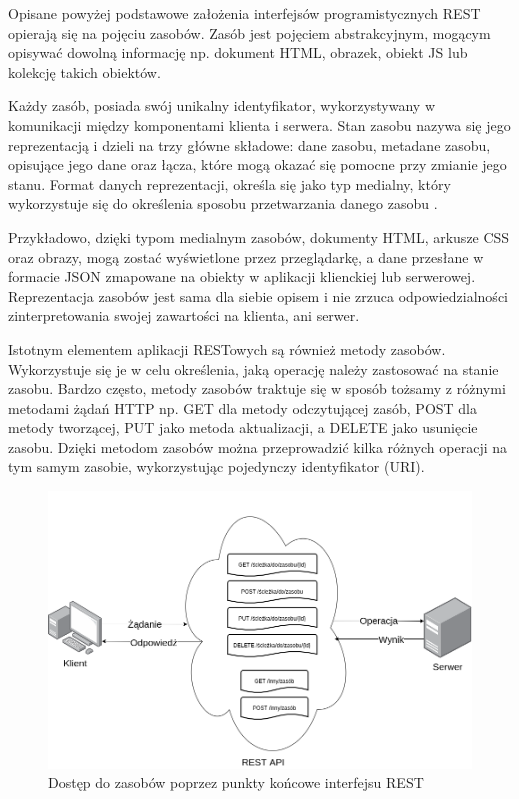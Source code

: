 Opisane powyżej podstawowe założenia interfejsów programistycznych REST opierają się na pojęciu zasobów. Zasób jest pojęciem abstrakcyjnym, mogącym opisywać dowolną informację np. dokument HTML, obrazek, obiekt JS lub kolekcję takich obiektów.

Każdy zasób, posiada swój unikalny identyfikator, wykorzystywany w komunikacji między komponentami klienta i serwera. Stan zasobu nazywa się jego reprezentacją i dzieli na trzy główne składowe: dane zasobu, metadane zasobu, opisujące jego dane oraz łącza, które mogą okazać się pomocne przy zmianie jego stanu. Format danych reprezentacji, określa się jako typ medialny, który wykorzystuje się do określenia sposobu przetwarzania danego zasobu \cite{restapi.media_types.rfc6838}.

Przykładowo, dzięki typom medialnym zasobów, dokumenty HTML, arkusze CSS oraz obrazy, mogą zostać wyświetlone przez przeglądarkę, a dane przesłane w formacie JSON zmapowane na obiekty w aplikacji klienckiej lub serwerowej. Reprezentacja zasobów jest sama dla siebie opisem i nie zrzuca odpowiedzialności zinterpretowania swojej zawartości na klienta, ani serwer.

Istotnym elementem aplikacji RESTowych są również metody zasobów. Wykorzystuje się je w celu określenia, jaką operację należy zastosować na stanie zasobu. Bardzo często, metody zasobów traktuje się w sposób tożsamy z różnymi metodami żądań HTTP np. GET dla metody odczytującej zasób, POST dla metody tworzącej, PUT jako metoda aktualizacji, a DELETE jako usunięcie zasobu. Dzięki metodom zasobów można przeprowadzić kilka różnych operacji na tym samym zasobie, wykorzystując pojedynczy identyfikator (URI).

\begin{figure}[!htbp] 
    \centering
    \includegraphics[width=\textwidth]{img/chapter3/rest.endpoints.png}
    \caption{Dostęp do zasobów poprzez punkty końcowe interfejsu REST}
    \label{fig:rest.endpoints}
\end{figure}

